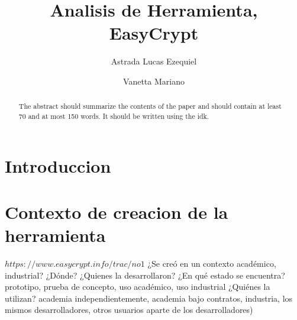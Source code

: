 \documentclass[runningheads,a4paper]{llncs}
\begin{document}
\mainmatter  %

\title{Analisis de Herramienta, EasyCrypt}


%
%
\author{Astrada Lucas Ezequiel
\and Vanetta Mariano}
%


%
%

\maketitle


\begin{abstract}
The abstract should summarize the contents of the paper and should
contain at least 70 and at most 150 words. It should be written using the idk.
\end{abstract}

\section{Introduccion}

\section{Contexto de creacion de la herramienta}
$https://www.easycrypt.info/trac/no1$
	¿Se creó en un contexto académico, industrial? 
	¿Dónde? 
	¿Quienes la desarrollaron? 
	¿En qué estado se encuentra? prototipo, prueba de concepto, uso académico, uso industrial 
	¿Quiénes la utilizan? academia independientemente, academia bajo contratos, industria, los mismos desarrolladores, otros usuarios aparte de los desarrolladores)
\end{document}
